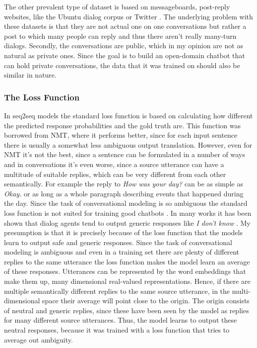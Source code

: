 \documentclass[12pt]{article}
\begin{document}
The other prevalent type of dataset is based on messageboards, post-reply websites, like the Ubuntu dialog corpus \cite{Lowe:2015} or Twitter \cite{Shang:2015,Li:2016,Jena:2017}. The underlying problem with these datasets is that they are not actual one on one conversations but rather a post to which many people can reply and thus there aren't really many-turn dialogs. Secondly, the conversations are public, which in my opinion are not as natural as private ones. Since the goal is to build an open-domain chatbot that can hold private conversations, the data that it was trained on should also be similar in nature.

\subsubsection{The Loss Function} \label{sssec:loss_function}
In seq2seq models the standard loss function is based on calculating how different the predicted response probabilities and the gold truth are. This function was borrowed from NMT, where it performs better, since for each input sentence there is usually a somewhat less ambiguous output translation. However, even for NMT it's not the best, since a sentence can be formulated in a number of ways and in conversations it's even worse, since a source utterance can have a multitude of suitable replies, which can be very different from each other semantically. For example the reply to \textit{How was your day?} can be as simple as \textit{Okay.} or as long as a whole paragraph describing events that happened during the day. Since the task of conversational modeling is so ambiguous the standard loss function is not suited for training good chatbots \cite{Vinyals:2015,Li:2015}. In many works it has been shown that dialog agents tend to output generic responses like \textit{I don't know} \cite{Vinyals:2015,Serban:2015,Li:2015,Li:2016,Jena:2017}. My presumption is that it is precisely because of the loss function that the models learn to output safe and generic responses. Since the task of conversational modeling is ambiguous and even in a training set there are plenty of different replies to the same utterance the loss function makes the model learn an average of these responses. Utterances can be represented by the word embeddings that make them up, many dimensional real-valued representations. Hence, if there are multiple semantically different replies to the same source utterance, in the multi-dimensional space their average will point close to the origin. The origin consists of neutral and generic replies, since these have been seen by the model as replies for many different source utterances. Thus, the model learns to output these neutral responses, because it was trained with a loss function that tries to average out ambiguity.
\end{document}
